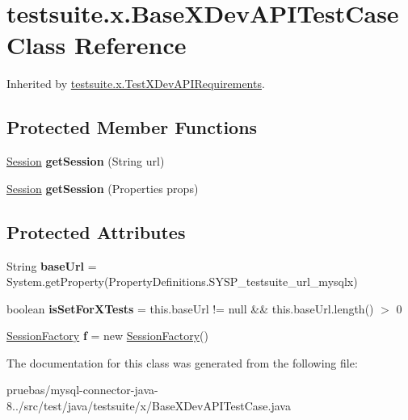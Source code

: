 \hypertarget{classtestsuite_1_1x_1_1_base_x_dev_a_p_i_test_case}{}\section{testsuite.\+x.\+Base\+X\+Dev\+A\+P\+I\+Test\+Case Class Reference}
\label{classtestsuite_1_1x_1_1_base_x_dev_a_p_i_test_case}


Inherited by \mbox{\hyperlink{classtestsuite_1_1x_1_1_test_x_dev_a_p_i_requirements}{testsuite.\+x.\+Test\+X\+Dev\+A\+P\+I\+Requirements}}.

\subsection*{Protected Member Functions}
\begin{DoxyCompactItemize}
\item 
\mbox{\label{classtestsuite_1_1x_1_1_base_x_dev_a_p_i_test_case_a61c03b936df28ace5d4458def5252eb7}} 
\mbox{\hyperlink{interfacecom_1_1mysql_1_1cj_1_1xdevapi_1_1_session}{Session}} {\bfseries get\+Session} (String url)
\item 
\mbox{\label{classtestsuite_1_1x_1_1_base_x_dev_a_p_i_test_case_a362d347ff4b2c8f0a44262d2f57e534b}} 
\mbox{\hyperlink{interfacecom_1_1mysql_1_1cj_1_1xdevapi_1_1_session}{Session}} {\bfseries get\+Session} (Properties props)
\end{DoxyCompactItemize}
\subsection*{Protected Attributes}
\begin{DoxyCompactItemize}
\item 
\mbox{\label{classtestsuite_1_1x_1_1_base_x_dev_a_p_i_test_case_a94e9be8bb82a4130d5a8fc48fb8645b1}} 
String {\bfseries base\+Url} = System.\+get\+Property(Property\+Definitions.\+S\+Y\+S\+P\+\_\+testsuite\+\_\+url\+\_\+mysqlx)
\item 
\mbox{\label{classtestsuite_1_1x_1_1_base_x_dev_a_p_i_test_case_a23802eeb5cfd30dec1f476c94d909285}} 
boolean {\bfseries is\+Set\+For\+X\+Tests} = this.\+base\+Url != null \&\& this.\+base\+Url.\+length() $>$ 0
\item 
\mbox{\label{classtestsuite_1_1x_1_1_base_x_dev_a_p_i_test_case_aa5304216e343498a6ae2d1d9a90016df}} 
\mbox{\hyperlink{classcom_1_1mysql_1_1cj_1_1xdevapi_1_1_session_factory}{Session\+Factory}} {\bfseries f} = new \mbox{\hyperlink{classcom_1_1mysql_1_1cj_1_1xdevapi_1_1_session_factory}{Session\+Factory}}()
\end{DoxyCompactItemize}


The documentation for this class was generated from the following file\+:\begin{DoxyCompactItemize}
\item 
pruebas/mysql-\/connector-\/java-\/8../src/test/java/testsuite/x/Base\+X\+Dev\+A\+P\+I\+Test\+Case.\+java\end{DoxyCompactItemize}
